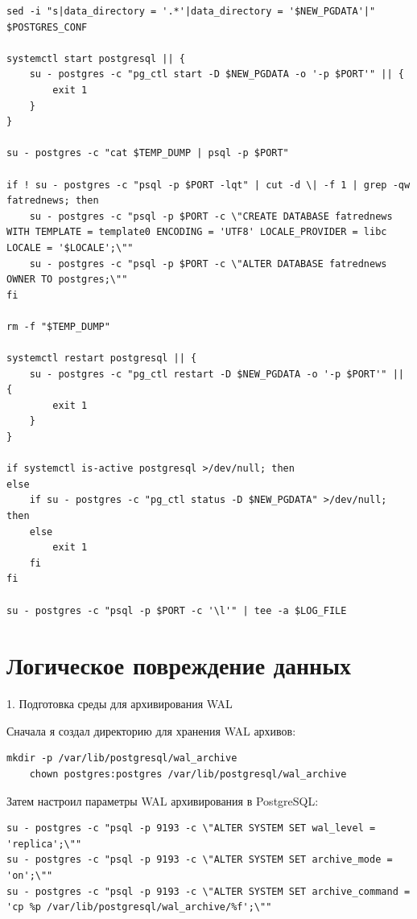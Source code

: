 \documentclass{article}
\begin{document}
\begin{lstlisting}[caption={kitty}, label={lst:example}]
sed -i "s|data_directory = '.*'|data_directory = '$NEW_PGDATA'|" $POSTGRES_CONF

systemctl start postgresql || {
    su - postgres -c "pg_ctl start -D $NEW_PGDATA -o '-p $PORT'" || {
        exit 1
    }
}

su - postgres -c "cat $TEMP_DUMP | psql -p $PORT"

if ! su - postgres -c "psql -p $PORT -lqt" | cut -d \| -f 1 | grep -qw fatrednews; then
    su - postgres -c "psql -p $PORT -c \"CREATE DATABASE fatrednews WITH TEMPLATE = template0 ENCODING = 'UTF8' LOCALE_PROVIDER = libc LOCALE = '$LOCALE';\""
    su - postgres -c "psql -p $PORT -c \"ALTER DATABASE fatrednews OWNER TO postgres;\""
fi

rm -f "$TEMP_DUMP"

systemctl restart postgresql || {
    su - postgres -c "pg_ctl restart -D $NEW_PGDATA -o '-p $PORT'" || {
        exit 1
    }
}

if systemctl is-active postgresql >/dev/null; then
else
    if su - postgres -c "pg_ctl status -D $NEW_PGDATA" >/dev/null; then
    else
        exit 1
    fi
fi

su - postgres -c "psql -p $PORT -c '\l'" | tee -a $LOG_FILE

\end{lstlisting}

\section*{Логическое повреждение данных}

1. Подготовка среды для архивирования WAL

Сначала я создал директорию для хранения WAL архивов:

\begin{lstlisting}[caption={kitty}, label={lst:example}]
    mkdir -p /var/lib/postgresql/wal_archive
    chown postgres:postgres /var/lib/postgresql/wal_archive
\end{lstlisting}


Затем настроил параметры WAL архивирования в PostgreSQL:

\begin{lstlisting}[caption={kitty}, label={lst:example}]
su - postgres -c "psql -p 9193 -c \"ALTER SYSTEM SET wal_level = 'replica';\""
su - postgres -c "psql -p 9193 -c \"ALTER SYSTEM SET archive_mode = 'on';\""
su - postgres -c "psql -p 9193 -c \"ALTER SYSTEM SET archive_command = 'cp %p /var/lib/postgresql/wal_archive/%f';\""
\end{lstlisting}
\end{document}

